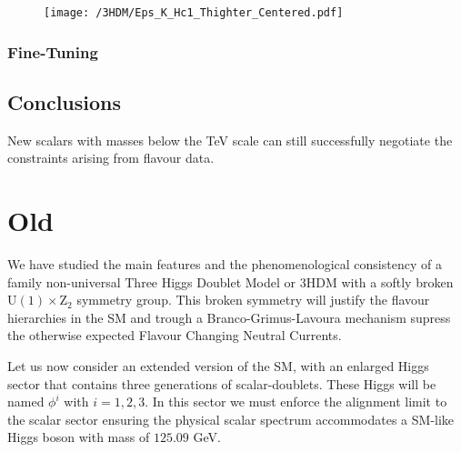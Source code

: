 \begin{figure}[H]
	\centering
	\texttt{[image: /3HDM/Eps\_K\_Hc1\_Thighter\_Centered.pdf]}
	\caption{}
	\label{fig:STU}
\end{figure}	

\subsubsection{Fine-Tuning}


\subsection{Conclusions}
 
New scalars with masses below
the TeV scale can still successfully negotiate the constraints arising from flavour data.

\section{Old}

We have studied the main features and the phenomenological  consistency of a family non-universal Three Higgs Doublet Model or 3HDM with a softly broken $\mathrm{U(1)\times Z_2} $ symmetry group. This broken symmetry will justify the flavour hierarchies in the SM and trough a Branco-Grimus-Lavoura mechanism supress the otherwise expected Flavour Changing Neutral Currents. 

Let us now consider an extended version of the SM, with an enlarged Higgs sector that contains three generations of scalar-doublets. These Higgs will be named $\phi^i$ with $i={1,2,3}$.  In this sector we must enforce the alignment limit to the scalar sector ensuring the physical scalar spectrum accommodates a SM-like Higgs boson with mass of $125.09$ GeV.